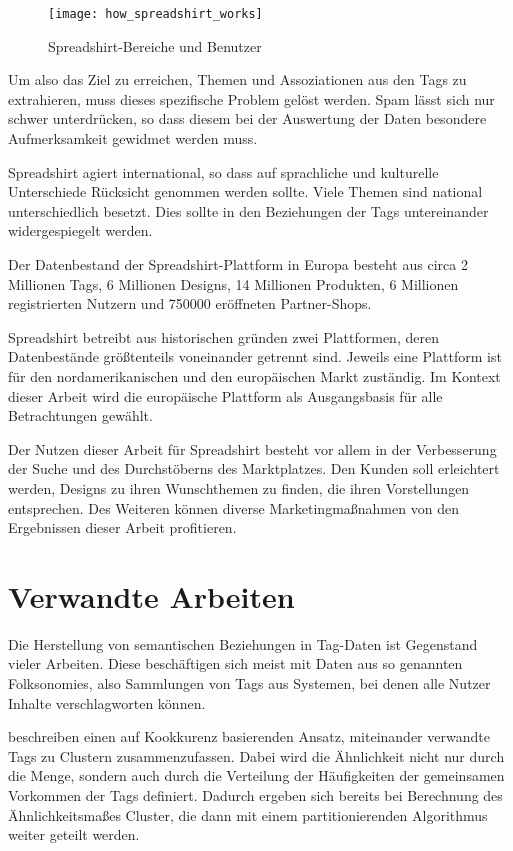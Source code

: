\begin{figure}[h]
\label{fig:howspreadshirtworks}
\begin{center}
    \texttt{[image: how\_spreadshirt\_works]}
\end{center}
\caption{Spreadshirt-Bereiche und Benutzer}
\end{figure}

Um also das Ziel zu erreichen, Themen und Assoziationen aus den Tags zu extrahieren, muss dieses spezifische Problem gelöst werden. Spam lässt sich nur schwer unterdrücken, so dass diesem bei der Auswertung der Daten besondere Aufmerksamkeit gewidmet werden muss.

Spreadshirt agiert international, so dass auf sprachliche und kulturelle Unterschiede Rücksicht genommen werden sollte. Viele Themen sind national unterschiedlich besetzt. Dies sollte in den Beziehungen der Tags untereinander widergespiegelt werden.

Der Datenbestand der Spreadshirt-Plattform in Europa besteht aus circa 2 Millionen Tags, 6 Millionen Designs, 14 Millionen Produkten, 6 Millionen registrierten Nutzern und \num{750000} eröffneten Partner-Shops.

\label{platforms}
Spreadshirt betreibt aus historischen gründen zwei Plattformen, deren Datenbestände größtenteils voneinander getrennt sind. Jeweils eine Plattform ist für den nordamerikanischen und den europäischen Markt zuständig. Im Kontext dieser Arbeit wird die europäische Plattform als Ausgangsbasis für alle Betrachtungen gewählt.

Der Nutzen dieser Arbeit für Spreadshirt besteht vor allem in der Verbesserung der Suche und des Durchstöberns des Marktplatzes. Den Kunden soll erleichtert werden, Designs zu ihren Wunschthemen zu finden, die ihren Vorstellungen entsprechen. Des Weiteren können diverse Marketingmaßnahmen von den Ergebnissen dieser Arbeit profitieren.

\section{Verwandte Arbeiten}

Die Herstellung von semantischen Beziehungen in Tag-Daten ist Gegenstand vieler Arbeiten. Diese beschäftigen sich meist mit Daten aus so genannten Folksonomies, also Sammlungen von Tags aus Systemen, bei denen alle Nutzer Inhalte verschlagworten können.

\textcite{bks2006} beschreiben einen auf Kookkurenz basierenden Ansatz, miteinander verwandte Tags zu Clustern zusammenzufassen. Dabei wird die Ähnlichkeit nicht nur durch die Menge, sondern auch durch die Verteilung der Häufigkeiten der gemeinsamen Vorkommen der Tags definiert. Dadurch ergeben sich bereits bei Berechnung des Ähnlichkeitsmaßes Cluster, die dann mit einem partitionierenden Algorithmus weiter geteilt werden.

